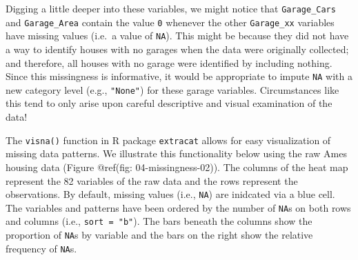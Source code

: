 \documentclass[]{book}
\newenvironment{Shaded}{\begin{snugshade}}{\end{snugshade}}
\newcommand{\DataTypeTok}[1]{\textcolor[rgb]{0.13,0.29,0.53}{#1}}
\newcommand{\KeywordTok}[1]{\textcolor[rgb]{0.13,0.29,0.53}{\textbf{#1}}}
\newcommand{\NormalTok}[1]{#1}
\newcommand{\OperatorTok}[1]{\textcolor[rgb]{0.81,0.36,0.00}{\textbf{#1}}}
\newcommand{\StringTok}[1]{\textcolor[rgb]{0.31,0.60,0.02}{#1}}
\theoremstyle{definition}
\theoremstyle{definition}
\theoremstyle{definition}
\theoremstyle{remark}
\begin{document}
Digging a little deeper into these variables, we might notice that
\texttt{Garage\_Cars} and \texttt{Garage\_Area} contain the value
\texttt{0} whenever the other \texttt{Garage\_xx} variables have missing
values (i.e.~a value of \texttt{NA}). This might be because they did not
have a way to identify houses with no garages when the data were
originally collected; and therefore, all houses with no garage were
identified by including nothing. Since this missingness is informative,
it would be appropriate to impute \texttt{NA} with a new category level
(e.g., \texttt{"None"}) for these garage variables. Circumstances like
this tend to only arise upon careful descriptive and visual examination
of the data!

\begin{Shaded}
\end{Shaded}

The \texttt{visna()} function in R package \texttt{extracat}
\citep{R-extracat} allows for easy visualization of missing data
patterns. We illustrate this functionality below using the raw Ames
housing data (Figure @ref(fig: 04-missingness-02)). The columns of the
heat map represent the 82 variables of the raw data and the rows
represent the observations. By default, missing values (i.e.,
\texttt{NA}) are inidcated via a blue cell. The variables and patterns
have been ordered by the number of \texttt{NA}s on both rows and columns
(i.e., \texttt{sort\ =\ "b"}). The bars beneath the columns show the
proportion of \texttt{NA}s by variable and the bars on the right show
the relative frequency of \texttt{NA}s.
\end{document}
